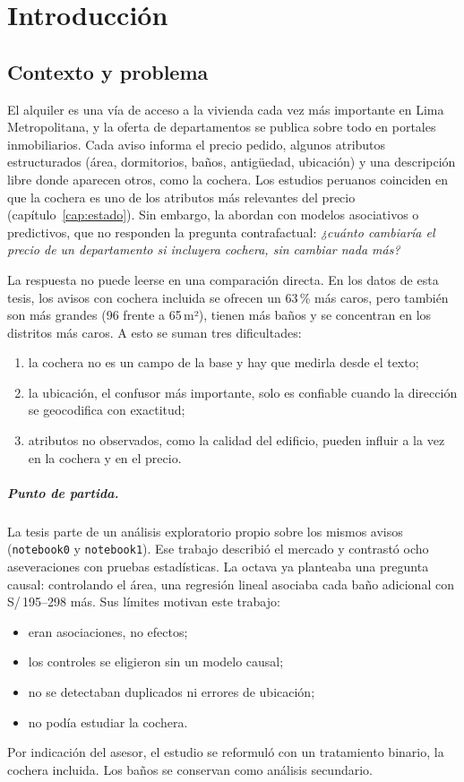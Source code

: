 \chapter{Introducción}

\section{Contexto y problema}

El alquiler es una vía de acceso a la vivienda cada vez más importante en Lima Metropolitana, y la oferta de departamentos se publica sobre todo en portales inmobiliarios. Cada aviso informa el precio pedido, algunos atributos estructurados (área, dormitorios, baños, antigüedad, ubicación) y una descripción libre donde aparecen otros, como la cochera. Los estudios peruanos coinciden en que la cochera es uno de los atributos más relevantes del precio (capítulo~\ref{cap:estado}). Sin embargo, la abordan con modelos asociativos o predictivos, que no responden la pregunta contrafactual: \emph{¿cuánto cambiaría el precio de un departamento si incluyera cochera, sin cambiar nada más?}

La respuesta no puede leerse en una comparación directa. En los datos de esta tesis, los avisos con cochera incluida se ofrecen un 63\,\% más caros, pero también son más grandes (96 frente a 65\,m²), tienen más baños y se concentran en los distritos más caros. A esto se suman tres dificultades:
\begin{enumerate}[label=(\roman*)]
\item la cochera no es un campo de la base y hay que medirla desde el texto;
\item la ubicación, el confusor más importante, solo es confiable cuando la dirección se geocodifica con exactitud;
\item atributos no observados, como la calidad del edificio, pueden influir a la vez en la cochera y en el precio.
\end{enumerate}

\paragraph{Punto de partida.} La tesis parte de un análisis exploratorio propio sobre los mismos avisos (\texttt{notebook0} y \texttt{notebook1}). Ese trabajo describió el mercado y contrastó ocho aseveraciones con pruebas estadísticas. La octava ya planteaba una pregunta causal: controlando el área, una regresión lineal asociaba cada baño adicional con S/\,195--298 más. Sus límites motivan este trabajo:
\begin{itemize}
\item eran asociaciones, no efectos;
\item los controles se eligieron sin un modelo causal;
\item no se detectaban duplicados ni errores de ubicación;
\item no podía estudiar la cochera.
\end{itemize}
Por indicación del asesor, el estudio se reformuló con un tratamiento binario, la cochera incluida. Los baños se conservan como análisis secundario.

